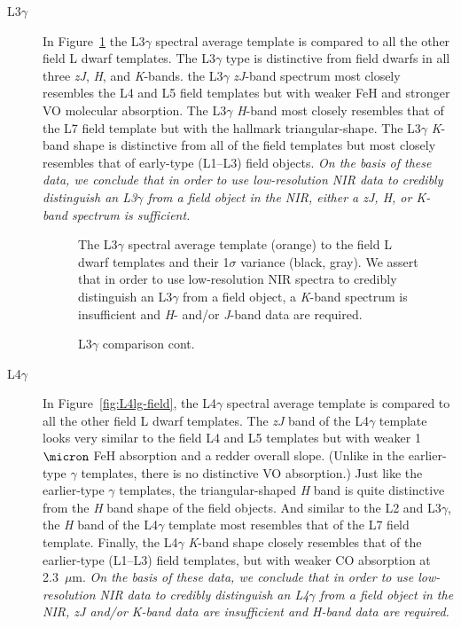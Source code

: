 \documentclass[modern]{aastex61}
\begin{document}
\begin{description}
\item[L3$\gamma$]{
In Figure~\ref{fig:L3lg-field}\added{,} the L3$\gamma$ spectral average template is compared to all the other field L dwarf templates.
The L3$\gamma$ type is distinctive from field dwarfs in all three \emph{zJ}, \emph{H}, and \emph{K}-bands.
the L3$\gamma$ \emph{zJ}-band spectrum most closely resembles the L4 and L5 field templates but with weaker FeH and stronger VO molecular absorption.
The L3$\gamma$ \emph{H}-band most closely resembles that of the L7 field template but with the hallmark triangular-shape.
The L3$\gamma$ \emph{K}-band shape is distinctive from all of the field templates but most closely resembles that of early-type (L1--L3) field objects.
\emph{On the basis of these data, we conclude that in order to use low-resolution NIR data to credibly distinguish an L3$\gamma$ from a field object in the NIR, either a \emph{zJ}, \emph{H}, or \emph{K}-band spectrum is sufficient.}
}

\begin{figure}[b]
  \caption{The L3$\gamma$ spectral average template (orange) to the field L dwarf templates and their 1$\sigma$ variance (black, gray).
  We assert that in order to use low-resolution NIR spectra to credibly distinguish an L3$\gamma$ from a field object, a \emph{K}-band spectrum is insufficient and \emph{H}- and/or \emph{J}-band data are required.}
  \label{fig:L3lg-field}
\end{figure}

\begin{figure}
     \caption{L3$\gamma$ comparison cont.}
\end{figure}
\clearpage

\item[L4$\gamma$]{
In Figure~\ref{fig:L4lg-field}, the L4$\gamma$ spectral average template is compared to all the other field L dwarf templates.
The \emph{zJ} band of the L4$\gamma$ template looks very similar to the field L4 and L5 templates but with weaker 1$\micron$ FeH absorption and a redder overall slope. (Unlike in the earlier-type $\gamma$ templates, there is no distinctive VO absorption.)
Just like the earlier-type $\gamma$ templates, the triangular-shaped \emph{H} band is quite distinctive from the \emph{H} band shape of the field objects. And similar to the L2 and L3$\gamma$, the \emph{H} band of the L4$\gamma$ template most resembles that of the L7 field template.
Finally, the L4$\gamma$ \emph{K}-band shape closely resembles that of the earlier-type (L1--L3) field templates, but with weaker CO absorption at 2.3~$\mu$m.
\emph{On the basis of these data, we conclude that in order to use low-resolution NIR data to credibly distinguish an L4$\gamma$ from a field object in the NIR, \emph{zJ} and/or \emph{K}-band data are insufficient and \emph{H}-band data are required.}
}
\end{description}
\end{document}
